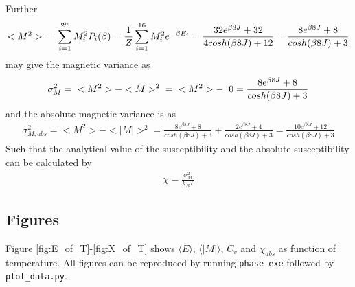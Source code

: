 \documentclass[12pt,english,a4paper]{article}
\begin{document}
Further
\begin{align*}
    <M^2> \hspace{0.2cm} 
          = \sum_{i=1}^{2^n} M_i^2P_i(\beta) 
          = \frac{1}{Z} \sum_{i=1}^{16} M_i^2e^{-\beta E_i}
          = \frac{32e^{\beta 8J} + 32}
                 {4cosh(\beta 8J) + 12}
          = \frac{8e^{\beta 8J} + 8}{cosh(\beta 8J) + 3}
\end{align*}
may give the magnetic variance as
\begin{align*}
    \sigma_M^2 = \hspace{0.2cm} <M^2> - <M>^2 \hspace{0.2cm}
               = \hspace{0.2cm} <M^2> - \hspace{0.2cm} 0
               = \frac{8e^{\beta 8J} + 8}{cosh(\beta 8J) + 3}
\end{align*}
and the absolute magnetic variance is as
\begin{align*}
    \sigma^2_{M,abs} = <M^2> - <|M|>^2 = \frac{8e^{\beta 8J} + 8}{cosh(\beta 8J) + 3}+\frac{2e^{\beta 8J} + 4}{cosh(\beta 8J) + 3}= \frac{10e^{\beta 8J} + 12}{cosh(\beta 8J) + 3}
\end{align*}
Such that the analytical value of the susceptibility and the absolute susceptibility can be calculated by
\begin{align*}
    \chi = \frac{\sigma_M^2}{k_BT}
\end{align*}

\subsection{Figures}

Figure \ref{fig:E_of_T}-\ref{fig:X_of_T} shows $\langle E\rangle$, $\langle |M|\rangle$, $C_v$ and $\chi_{abs}$ as function of temperature. All figures can be reproduced by running \texttt{phase\_exe} followed by \texttt{plot\_data.py}.
\end{document}
